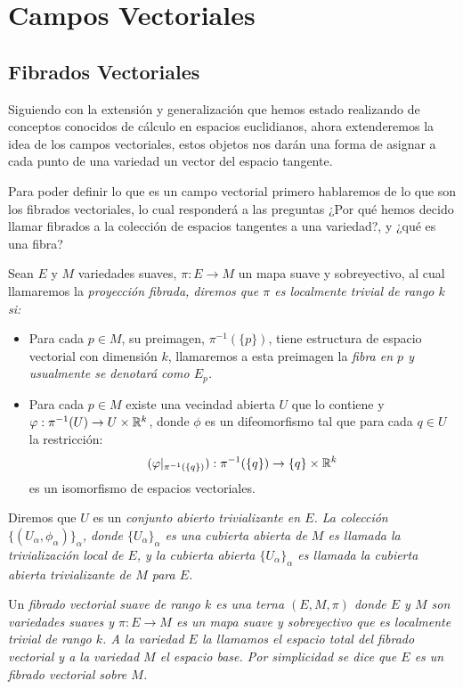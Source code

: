 \section{Campos Vectoriales}\label{Sección: Campos Vectoriales}
\subsection{Fibrados Vectoriales}
Siguiendo con la extensión y generalización que hemos estado realizando de conceptos conocidos de cálculo en espacios euclidianos, ahora extenderemos la idea de los campos vectoriales, estos objetos nos darán una forma de asignar a cada punto de una variedad un vector del espacio tangente.

Para poder definir lo que es un campo vectorial primero hablaremos de lo que son los fibrados vectoriales, lo cual responderá a las preguntas ¿Por qué hemos decido llamar fibrados a la colección de espacios tangentes a una variedad?, y ¿qué es una fibra?

\begin{definition}
	Sean $E$ y $M$ variedades suaves, $\pi: E \to M$ un mapa suave y sobreyectivo, al cual llamaremos la \it{proyección fibrada}, diremos que $\pi$ es \it{localmente trivial de rango $k$} si:

	\begin{itemize}
		\item Para cada $p \in M$, su preimagen, $\pi^{-1}(\{p\})$, tiene estructura de espacio vectorial con dimensión $k$, llamaremos a esta preimagen la \it{fibra en $p$} y usualmente se denotará como $E_p$.

		\item Para cada $p \in M$ existe una vecindad abierta $U$ que lo contiene y $\varphi: \pi^{-1}(U) \to U \times \mathbb{R}^{k}$, donde $\phi$ es un difeomorfismo tal que para cada $q \in U$ la restricción:
      \[ (\varphi|_{\pi^{-1}(\{q\})}): \pi^{-1}(\{q\}) \to \{q\} \times \mathbb{R}^{k} \]
		      es un isomorfismo de espacios vectoriales.
	\end{itemize}

	Diremos que $U$ es un \it{conjunto abierto trivializante} en $E$. La colección $\{(U_\alpha, \phi_\alpha)\}_{\alpha}$, donde $\{U_{\alpha}\}_{\alpha}$ es una cubierta abierta de $M$ es llamada la trivialización local de $E$, y la cubierta abierta $\{U_\alpha\}_{\alpha}$ es llamada la cubierta abierta trivializante de $M$ para $E$.

  Un \it{fibrado vectorial suave de rango $k$} es una terna $(E,M,\pi)$ donde $E$ y $M$ son variedades suaves y $\pi: E \to M$ es un mapa suave y sobreyectivo que es localmente trivial de rango $k$. A la variedad $E$ la llamamos el \it{espacio total} del fibrado vectorial y a la variedad $M$ el \it{espacio base}. Por simplicidad se dice que \it{$E$ es un fibrado vectorial sobre $M$}.
\end{definition}

